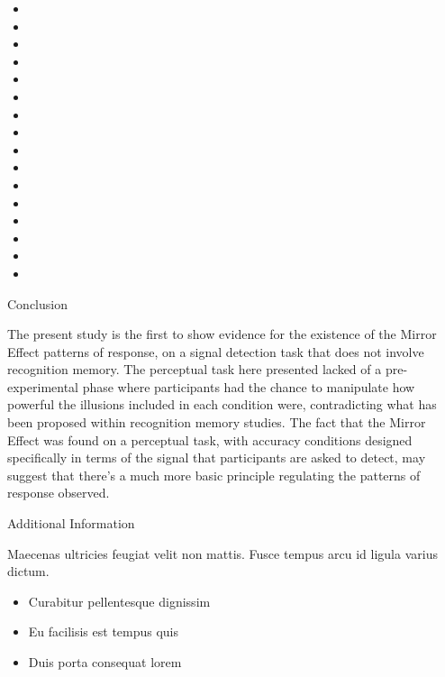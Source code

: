 \documentclass[final]{beamer}
\newlength{\onecolwid}
\begin{document}
\begin{frame}[t]
\begin{columns}[t]
\begin{column}{\onecolwid}
\begin{itemize}
\item
\item
\item
\item
\item
\item
\item
\item
\item
\item
\item
\item
\item
\item
\item
\item
\end{itemize}

\begin{block}{Conclusion}

The present study is the first to show evidence for the existence of the Mirror Effect patterns of response, on a signal detection task that does not involve recognition memory. The perceptual task here presented lacked of a pre-experimental phase where participants had the chance to manipulate how powerful the illusions included in each condition were, contradicting what has been proposed within recognition memory studies. The fact that the Mirror Effect was found on a perceptual task, with accuracy conditions designed specifically in terms of the signal that participants are asked to detect, may suggest that there’s a much more basic principle regulating the patterns of response observed.

\end{block}


\begin{block}{Additional Information}

Maecenas ultricies feugiat velit non mattis. Fusce tempus arcu id ligula varius dictum. 
\begin{itemize}
\item Curabitur pellentesque dignissim
\item Eu facilisis est tempus quis
\item Duis porta consequat lorem
\end{itemize}


\end{block}
\end{column}
\end{columns}
\end{frame}
\end{document}
